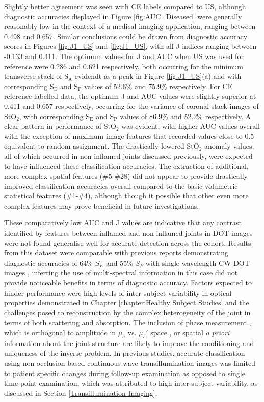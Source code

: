\documentclass[twoside]{bhamthesis}
\theoremstyle{definition}
\begin{document}
Slightly better agreement was seen with CE labels compared to US, although diagnostic accuracies displayed in Figure \ref{fig:AUC_Diseased} were generally reasonably low in the context of a medical imaging application, ranging between 0.498 and 0.657. Similar conclusions could be drawn from diagnostic accuracy scores in Figures \ref{fig:J1_US} and \ref{fig:J1_US}, with all J indices ranging between -0.133 and 0.411. The optimum values for J and AUC when US was used for reference were 0.286 and 0.621 respectively, both occurring for the minimum transverse stack of $\mathrm{S_A}$ evidendt as a peak in Figure \ref{fig:J1_US}(a) and with corresponding $\mathrm{S_E}$ and $\mathrm{S_P}$ values of 52.6\% and 75.9\% respectively. For CE reference labelled data, the optimum J and AUC values were slightly superior at 0.411 and 0.657 respectively, occurring for the variance of coronal stack images of $\mathrm{StO_2}$, with corresponding $\mathrm{S_E}$ and $\mathrm{S_P}$ values of 86.9\% and 52.2\% respectively. A clear pattern in performance of $\mathrm{StO_2}$ was evident, with higher AUC values overall with the exception of maximum image features that recorded values close to 0.5 equivalent to random assignment. The drastically lowered $\mathrm{StO_2}$ anomaly values, all of which occurred in non-inflamed joints discussed previously, were expected to have influenced these classification accuracies. The extraction of additional, more complex spatial features (\#5-\#28) did not appear to provide drastically improved classification accuracies overall compared to the basic volumetric statistical features (\#1-\#4), although though it possible that other even more complex features may prove beneficial in future investigations. 

These comparatively low AUC and J values are indicative that any contrast identified by features between inflamed and non-inflamed joints in DOT images were not found generalise well for accurate detection across the cohort. Results from this dataset were comparable with previous reports demonstrating diagnostic accuracies of 64\% $S_E$ and 55\% $S_P$ with single wavelength CW-DOT images \cite{hielscher2011frequency}, inferring the use of multi-spectral information in this case did not provide noticeable benefits in terms of diagnostic accuracy. Factors expected to hinder performance were high levels of inter-subject variability in optical properties demonstrated in Chapter 
\ref{chapter:Healthy Subject Studies} and the challenges posed to reconstruction by the complex heterogeneity of the joint in terms of both scattering and absorption. The inclusion of phase measurement \cite{hielscher2011frequency}, which is orthogonal to amplitude in $\mu_a$ vs. $\mu_s'$ space \cite{chu2009image}, or spatial \textit{a priori} information about the joint structure \cite{yuan2010image} are likely to improve the conditioning and uniqueness of the inverse problem. In previous studies, accurate classification using non-occlusion based continuous wave transillumination images was limited to patient specific changes during follow-up examination as opposed to single time-point examination, which was attributed to high inter-subject variability, as discussed in Section \ref{Transillumination Imaging}. 
 
\end{document}
